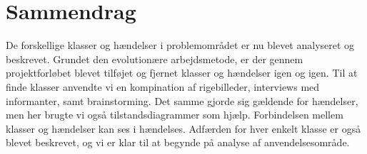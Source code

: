\section{Sammendrag}

De forskellige klasser og hændelser i problemområdet er nu blevet analyseret og beskrevet. Grundet den evolutionære arbejdsmetode, er der gennem projektforløbet blevet tilføjet og fjernet klasser og hændelser igen og igen. Til at finde klasser anvendte vi en kompination af rigebilleder, interviews med informanter, samt brainstorming. Det samme gjorde sig gældende for hændelser, men her brugte vi også tilstandsdiagrammer som hjælp. Forbindelsen mellem klasser og hændelser kan ses i hændelses. Adfærden for hver enkelt klasse er også blevet beskrevet, og vi er klar til at begynde på analyse af anvendelsesområde. 